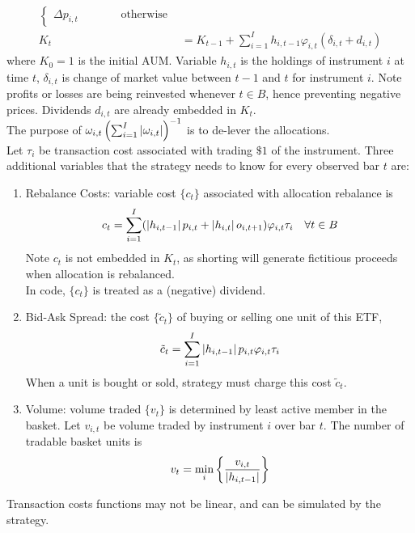 \begin{method}
\begin{align}
\begin{cases}
\Delta p_{i,t} \ \ \ \ \ \ \ \ \ \ \ \ \ \ \ \ \ \text{otherwise}
\end{cases} \nonumber \\
K_t &= K_{t-1} + \sum\limits_{i=1}^I h_{i, t-1} \varphi_{i,t} (\delta_{i,t} + d_{i,t}) \nonumber
\end{align}
where $K_0 = 1$ is the initial AUM. Variable $h_{i,t}$ is the holdings of instrument $i$ at time $t$, $\delta_{i,t}$ is change of market value between $t-1$ and $t$ for instrument $i$. Note profits or losses are being reinvested whenever $t \in B$, hence preventing negative prices. Dividends $d_{i,t}$ are already embedded in $K_t$.\\
The purpose of $\omega_{i,t} \left( \sum_{i=1}^I \left\lvert\omega_{i,t}\right\rvert \right)^{-1}$ is to de-lever the allocations.\\
Let $\tau_i$ be transaction cost associated with trading $\$1$ of the instrument. Three additional variables that the strategy needs to know for every observed bar $t$ are:
\begin{enumerate}[label=\roman*.]
\setlength{\itemsep}{0pt}
\item Rebalance Costs: variable cost $\{c_t\}$ associated with allocation rebalance is
\begin{equation}
c_t = \sum\limits_{i=1}^I (\left\lvert h_{i, t-1}\right\rvert p_{i,t} + \left\lvert h_{i,t}\right\rvert o_{i, t+1}) \varphi_{i,t} \tau_{i} \ \ \ \forall t \in B \nonumber
\end{equation}
Note $c_t$ is not embedded in $K_t$, as shorting will generate fictitious proceeds when allocation is rebalanced.\\
In code, $\{c_t\}$ is treated as a (negative) dividend.
\item Bid-Ask Spread: the cost $\{ \tilde{c}_t \}$ of buying or selling one unit of this ETF,
\begin{equation}
\tilde{c}_t = \sum\limits_{i=1}^I \left\lvert h_{i, t-1}\right\rvert p_{i, t} \varphi_{i,t} \tau_i \nonumber
\end{equation}
When a unit is bought or sold, strategy must charge this cost $\tilde{c}_t$.
\item Volume: volume traded $\{v_t \}$ is determined by least active member in the basket. Let $v_{i,t}$ be volume traded by instrument $i$ over bar $t$. The number of tradable basket units is
\begin{equation}
v_t = \min_i \left\{ \frac{v_{i,t}}{\left\lvert h_{i, t-1}\right\rvert} \right\} \nonumber
\end{equation}
\end{enumerate}
Transaction costs functions may not be linear, and can be simulated by the strategy.
\end{method}

